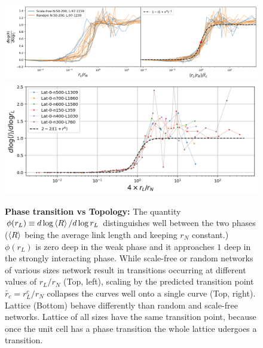 \documentclass[endfloats,nofootinbib,preprint,floatfix,titlepage,superscriptaddress,linenumbers]{revtex4-1} %
\begin{document}
{%
\begin{figure}
    \centering
    \includegraphics[width=\textwidth]{fig-09-19/phase-collapse-041018.png}
    \includegraphics[width=.6\textwidth]{fig-09-19/phase-lattice-042018-l.png}
    \caption{\scriptsize {\bf Phase transition vs Topology:} The quantity $\phi(r_L)\equiv d\log\left<R\right> /d\log r_L$ distinguishes well between the two phases  ($\left<R\right>$ being the average link length and keeping $r_N$ constant.)
    $\phi (r_L) $ is zero deep in the weak phase and it approaches $1$ deep in the strongly interacting phase. 
    While scale-free or random networks of various sizes network result in transitions occurring at different values of $r_L/r_N$ (Top, left), scaling by the predicted transition point $\tilde{r_c}=r^c_L/r_N$ collapses the curves well onto a single curve (Top, right).
    Lattice (Bottom) behave differently than random and scale-free networks. 
    Lattice of all sizes have the same transition point, because once the unit cell has a phase transition the whole lattice udergoes a transition. 
    }
    \label{fig:phase-collapse}
\end{figure}

}
\end{document}
